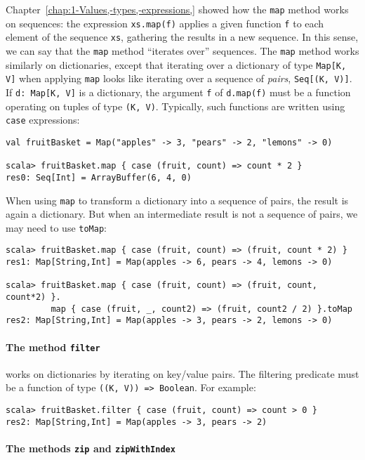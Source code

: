 Chapter~\ref{chap:1-Values,-types,-expressions,} showed how the
\lstinline!map! method works on sequences: the expression \lstinline!xs.map(f)!
applies a given function \lstinline!f! to each element of the sequence
\lstinline!xs!, gathering the results in a new sequence. In this
sense, we can say that the \lstinline!map! method \textsf{``}iterates over\textsf{''}
sequences. The \lstinline!map! method works similarly on dictionaries,
except that iterating over a dictionary of type \lstinline!Map[K, V]!
when applying \lstinline!map! looks like iterating over a sequence
of \emph{pairs}, \lstinline!Seq[(K, V)]!. If \lstinline!d: Map[K, V]!
is a dictionary, the argument \lstinline!f! of \lstinline!d.map(f)!
must be a function operating on tuples of type \lstinline!(K, V)!.
Typically, such functions are written using \lstinline!case! expressions:
\begin{lstlisting}
val fruitBasket = Map("apples" -> 3, "pears" -> 2, "lemons" -> 0)

scala> fruitBasket.map { case (fruit, count) => count * 2 }
res0: Seq[Int] = ArrayBuffer(6, 4, 0)
\end{lstlisting}
When using \lstinline!map! to transform a dictionary into a sequence
of pairs, the result is again a dictionary. But when an intermediate
result is not a sequence of pairs, we may need to use \lstinline!toMap!:
\begin{lstlisting}
scala> fruitBasket.map { case (fruit, count) => (fruit, count * 2) }
res1: Map[String,Int] = Map(apples -> 6, pears -> 4, lemons -> 0)

scala> fruitBasket.map { case (fruit, count) => (fruit, count, count*2) }.
         map { case (fruit, _, count2) => (fruit, count2 / 2) }.toMap
res2: Map[String,Int] = Map(apples -> 3, pears -> 2, lemons -> 0)
\end{lstlisting}


\paragraph*{The method \texttt{filter}}

works on dictionaries by iterating on key/value pairs. The filtering
predicate must be a function of type \lstinline!((K, V)) => Boolean!.
For example:
\begin{lstlisting}
scala> fruitBasket.filter { case (fruit, count) => count > 0 }
res2: Map[String,Int] = Map(apples -> 3, pears -> 2)
\end{lstlisting}


\paragraph*{The methods \texttt{zip} and \texttt{zipWithIndex}}

